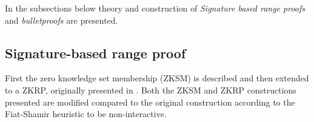 In the subsections below theory and construction of \textit{Signature based range proofs} and \textit{bulletproofs} are presented.




\subsection{Signature-based  range proof}
First the zero knowledge set membership (ZKSM) is described and then extended to a ZKRP, originally presented in \cite{RANGE-SET}. Both the ZKSM and ZKRP constructions presented are modified compared to the original construction according to the Fiat-Shamir heuristic to be non-interactive.

